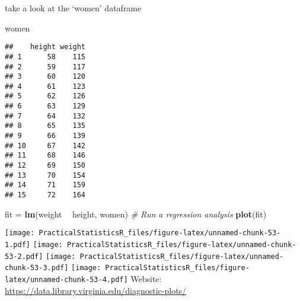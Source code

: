 \documentclass[
]{article}
\newenvironment{Shaded}{\begin{snugshade}}{\end{snugshade}}
\newcommand{\CommentTok}[1]{\textcolor[rgb]{0.56,0.35,0.01}{\textit{#1}}}
\newcommand{\KeywordTok}[1]{\textcolor[rgb]{0.13,0.29,0.53}{\textbf{#1}}}
\newcommand{\NormalTok}[1]{#1}
\newcommand{\OperatorTok}[1]{\textcolor[rgb]{0.81,0.36,0.00}{\textbf{#1}}}
\newcommand{\StringTok}[1]{\textcolor[rgb]{0.31,0.60,0.02}{#1}}
\begin{document}
take a look at the `women' dataframe

\begin{Shaded}
\begin{Highlighting}[]
\NormalTok{women}
\end{Highlighting}
\end{Shaded}

\begin{verbatim}
##    height weight
## 1      58    115
## 2      59    117
## 3      60    120
## 4      61    123
## 5      62    126
## 6      63    129
## 7      64    132
## 8      65    135
## 9      66    139
## 10     67    142
## 11     68    146
## 12     69    150
## 13     70    154
## 14     71    159
## 15     72    164
\end{verbatim}

\begin{Shaded}
\begin{Highlighting}[]
\NormalTok{fit =}\StringTok{ }\KeywordTok{lm}\NormalTok{(weight }\OperatorTok{~}\StringTok{ }\NormalTok{height, women) }\CommentTok{# Run a regression analysis}
\KeywordTok{plot}\NormalTok{(fit)}
\end{Highlighting}
\end{Shaded}

\texttt{[image: PracticalStatisticsR\_files/figure-latex/unnamed-chunk-53-1.pdf]}
\texttt{[image: PracticalStatisticsR\_files/figure-latex/unnamed-chunk-53-2.pdf]}
\texttt{[image: PracticalStatisticsR\_files/figure-latex/unnamed-chunk-53-3.pdf]}
\texttt{[image: PracticalStatisticsR\_files/figure-latex/unnamed-chunk-53-4.pdf]}
Website: \url{https://data.library.virginia.edu/diagnostic-plots/}
\end{document}
